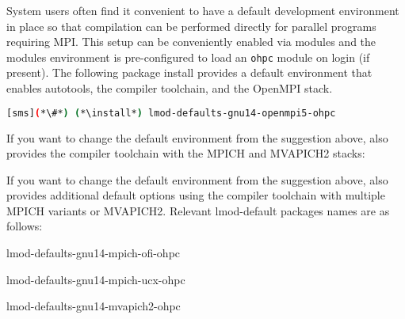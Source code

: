 System users often find it convenient to have a default development environment
in place so that compilation can be performed directly for parallel programs
requiring MPI. This setup can be conveniently enabled via modules and the \OHPC{}
modules environment is pre-configured to load an \texttt{ohpc} module on login
(if present). The following package install provides a default
environment that enables autotools, the \GNU{} compiler toolchain, and the
OpenMPI stack.

\begin{lstlisting}[language=bash]
[sms](*\#*) (*\install*) lmod-defaults-gnu14-openmpi5-ohpc
\end{lstlisting}

\begin{center}
\begin{tcolorbox}[]
\small
{}
If you want to change the default environment from the suggestion above, \OHPC{}
also provides the \GNU{} compiler toolchain with the MPICH and MVAPICH2 stacks:
\fi

If you want to change the default environment from the suggestion above, \OHPC{}
also provides additional default options using the \GNU{} compiler toolchain
with multiple MPICH variants or MVAPICH2. Relevant lmod-default packages names
are as follows:
\fi

\begin{itemize*}
\item lmod-defaults-gnu14-mpich-ofi-ohpc
\item lmod-defaults-gnu14-mpich-ucx-ohpc
\item lmod-defaults-gnu14-mvapich2-ohpc
\fi
\end{itemize*}
\end{tcolorbox}
\end{center}
